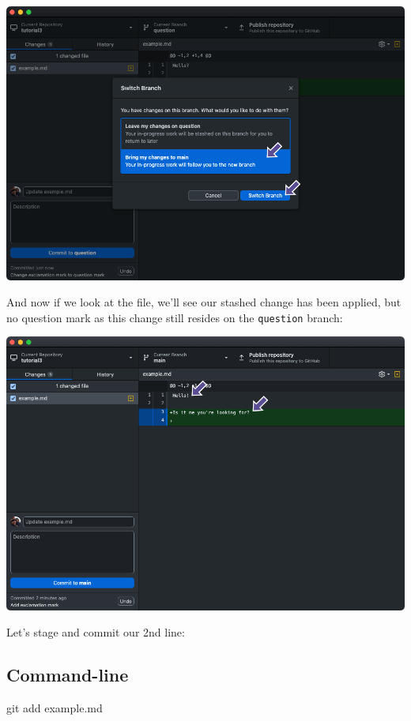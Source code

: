 \documentclass[
  letterpaper,
  DIV=11,
  numbers=noendperiod]{scrartcl}
\newenvironment{Shaded}{\begin{snugshade}}{\end{snugshade}}
\newcommand{\FunctionTok}[1]{\textcolor[rgb]{0.28,0.35,0.67}{#1}}
\newcommand{\NormalTok}[1]{\textcolor[rgb]{0.00,0.23,0.31}{#1}}
\begin{document}
\includegraphics{images/image40.png}

And now if we look at the file, we'll see our stashed change has been
applied, but no question mark as this change still resides on the
\texttt{question} branch:

\includegraphics{images/image41.png}

Let's stage and commit our 2nd line:

\subsection{Command-line}

\begin{Shaded}
\begin{Highlighting}[]
\FunctionTok{git}\NormalTok{ add example.md}
\end{Highlighting}
\end{Shaded}
\end{document}
